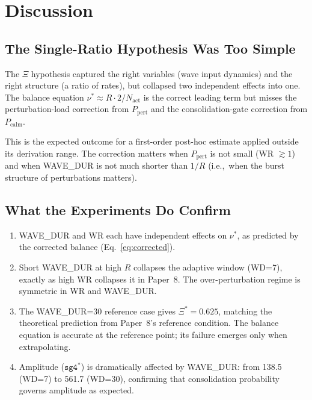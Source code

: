 \documentclass[11pt]{article}
\theoremstyle{remark}
\begin{document}
\section{Discussion}

\subsection{The Single-Ratio Hypothesis Was Too Simple}

The $\Xi$ hypothesis captured the right variables (wave input dynamics) and the
right structure (a ratio of rates), but collapsed two independent effects into one.
The balance equation $\nu^* \approx R \cdot 2 / N_{\text{act}}$ is the correct
leading term but misses the perturbation-load correction from $P_{\text{pert}}$
and the consolidation-gate correction from $P_{\text{calm}}$.

This is the expected outcome for a first-order post-hoc estimate applied outside
its derivation range. The correction matters when $P_{\text{pert}}$ is not small
(WR $\gtrsim 1$) and when WAVE\_DUR is not much shorter than $1/R$ (i.e.,\ when
the burst structure of perturbations matters).

\subsection{What the Experiments Do Confirm}

\begin{enumerate}
  \item WAVE\_DUR and WR each have independent effects on $\nu^*$, as predicted
    by the corrected balance (Eq.~\eqref{eq:corrected}).
  \item Short WAVE\_DUR at high $R$ collapses the adaptive window (WD=7), exactly
    as high WR collapses it in Paper~8. The over-perturbation regime is symmetric
    in WR and WAVE\_DUR.
  \item The WAVE\_DUR=30 reference case gives $\Xi^* = 0.625$, matching the
    theoretical prediction from Paper~8's reference condition. The balance equation
    is accurate at the reference point; its failure emerges only when extrapolating.
  \item Amplitude ($\mathtt{sg4}^*$) is dramatically affected by WAVE\_DUR: from
    138.5 (WD=7) to 561.7 (WD=30), confirming that consolidation probability
    governs amplitude as expected.
\end{enumerate}
\end{document}
